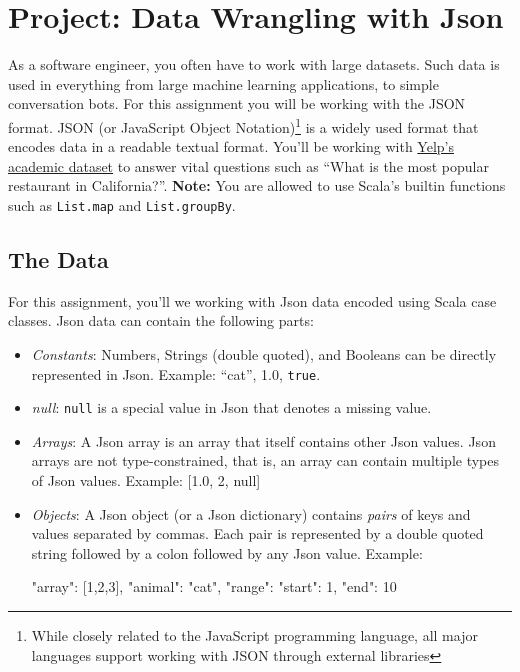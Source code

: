 \chapter{Project: Data Wrangling with Json}

\noindent As a software engineer, you often have to work with large datasets.
Such data is used in everything from large machine learning applications, to
simple conversation bots. For this assignment you will be working
with the JSON format. JSON (or JavaScript Object Notation)\footnote{While
closely related to the JavaScript programming language, all major languages
support working with JSON through external libraries} is a widely used format
that encodes data in a readable textual format. You'll be working with
\href{https://www.yelp.com/dataset}{Yelp's academic dataset} to answer vital
questions such as ``What is the most popular restaurant in California?''.
\textbf{Note:} You are allowed to use Scala's builtin functions such as
\verb|List.map| and \verb|List.groupBy|.

\section{The Data}
For this assignment, you'll we working with Json data encoded using Scala case
classes. Json data can contain the following parts:
\begin{itemize}
    \item \textit{Constants}: Numbers, Strings (double quoted), and Booleans
    can be directly represented in Json. Example: ``cat'', 1.0, \texttt{true}.

    \item \textit{null}: \texttt{null} is a special value in Json that
    denotes a missing value.

    \item \textit{Arrays}: A Json array is an array that itself contains other
    Json values. Json arrays are not type-constrained, that is, an array can
    contain multiple types of Json values. Example: [1.0, 2, null]

    \item \textit{Objects}: A Json object (or a Json dictionary) contains
    \textit{pairs} of keys and values separated by commas. Each pair is
    represented by a double quoted string followed by a colon followed by any
    Json value. Example:
    \begin{scalacode}
    {
        "array": [1,2,3],
        "animal": "cat",
        "range": { "start": 1, "end": 10 }
    }
    \end{scalacode}
\end{itemize}

